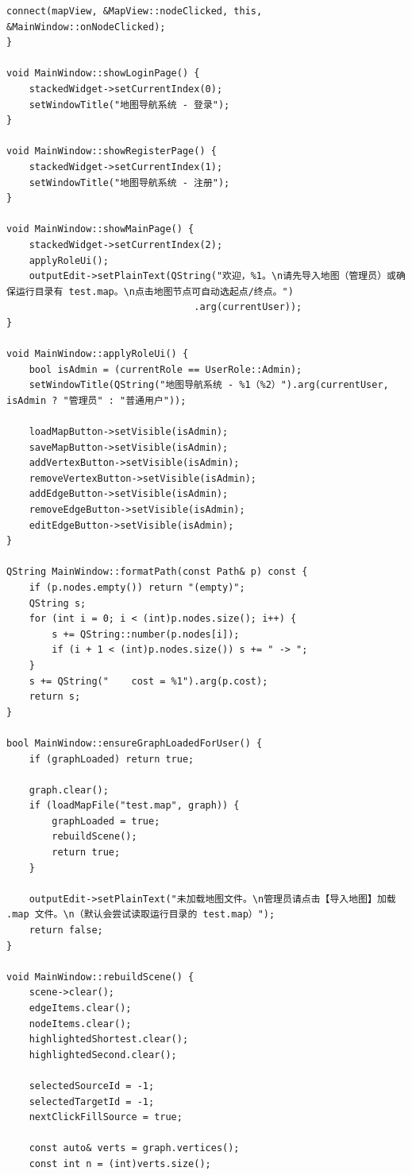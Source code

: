 \documentclass[UTF8,12pt,a4paper]{ctexart}
\begin{document}
\begin{lstlisting}[caption={mainwindow.cpp 源码}]
    connect(mapView, &MapView::nodeClicked, this, &MainWindow::onNodeClicked);
}

void MainWindow::showLoginPage() {
    stackedWidget->setCurrentIndex(0);
    setWindowTitle("地图导航系统 - 登录");
}

void MainWindow::showRegisterPage() {
    stackedWidget->setCurrentIndex(1);
    setWindowTitle("地图导航系统 - 注册");
}

void MainWindow::showMainPage() {
    stackedWidget->setCurrentIndex(2);
    applyRoleUi();
    outputEdit->setPlainText(QString("欢迎，%1。\n请先导入地图（管理员）或确保运行目录有 test.map。\n点击地图节点可自动选起点/终点。")
                                 .arg(currentUser));
}

void MainWindow::applyRoleUi() {
    bool isAdmin = (currentRole == UserRole::Admin);
    setWindowTitle(QString("地图导航系统 - %1（%2）").arg(currentUser, isAdmin ? "管理员" : "普通用户"));

    loadMapButton->setVisible(isAdmin);
    saveMapButton->setVisible(isAdmin);
    addVertexButton->setVisible(isAdmin);
    removeVertexButton->setVisible(isAdmin);
    addEdgeButton->setVisible(isAdmin);
    removeEdgeButton->setVisible(isAdmin);
    editEdgeButton->setVisible(isAdmin);
}

QString MainWindow::formatPath(const Path& p) const {
    if (p.nodes.empty()) return "(empty)";
    QString s;
    for (int i = 0; i < (int)p.nodes.size(); i++) {
        s += QString::number(p.nodes[i]);
        if (i + 1 < (int)p.nodes.size()) s += " -> ";
    }
    s += QString("    cost = %1").arg(p.cost);
    return s;
}

bool MainWindow::ensureGraphLoadedForUser() {
    if (graphLoaded) return true;

    graph.clear();
    if (loadMapFile("test.map", graph)) {
        graphLoaded = true;
        rebuildScene();
        return true;
    }

    outputEdit->setPlainText("未加载地图文件。\n管理员请点击【导入地图】加载 .map 文件。\n（默认会尝试读取运行目录的 test.map）");
    return false;
}

void MainWindow::rebuildScene() {
    scene->clear();
    edgeItems.clear();
    nodeItems.clear();
    highlightedShortest.clear();
    highlightedSecond.clear();

    selectedSourceId = -1;
    selectedTargetId = -1;
    nextClickFillSource = true;

    const auto& verts = graph.vertices();
    const int n = (int)verts.size();


\end{lstlisting}
\end{document}
